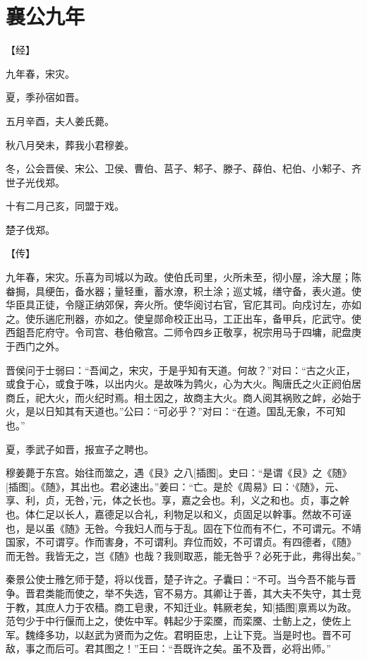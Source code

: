 \documentclass[a4paper,12pt,UTF8,twoside]{ctexbook}
\begin{document}
\chapter{襄公九年}


【经】

九年春，宋灾。

夏，季孙宿如晋。

五月辛酉，夫人姜氏薨。

秋八月癸未，葬我小君穆姜。

冬，公会晋侯、宋公、卫侯、曹伯、莒子、邾子、滕子、薛伯、杞伯、小邾子、齐世子光伐郑。

十有二月己亥，同盟于戏。

楚子伐郑。

【传】

九年春，宋灾。乐喜为司城以为政。使伯氏司里，火所未至，彻小屋，涂大屋；陈畚挶，具绠缶，备水器；量轻重，蓄水潦，积土涂；巡丈城，缮守备，表火道。使华臣具正徒，令隧正纳郊保，奔火所。使华阅讨右官，官庀其司。向戍讨左，亦如之。使乐遄庀刑器，亦如之。使皇郧命校正出马，工正出车，备甲兵，庀武守。使西鉏吾庀府守。令司宫、巷伯儆宫。二师令四乡正敬享，祝宗用马于四墉，祀盘庚于西门之外。

晋侯问于士弱曰：“吾闻之，宋灾，于是乎知有天道。何故？”对曰：“古之火正，或食于心，或食于咮，以出内火。是故咮为鹑火，心为大火。陶唐氏之火正阏伯居商丘，祀大火，而火纪时焉。相土因之，故商主大火。商人阅其祸败之衅，必始于火，是以日知其有天道也。”公曰：“可必乎？”对曰：“在道。国乱无象，不可知也。”

夏，季武子如晋，报宣子之聘也。

穆姜薨于东宫。始往而筮之，遇《艮》之八[插图]。史曰：“是谓《艮》之《随》[插图]。《随》，其出也。君必速出。”姜曰：“亡。是於《周易》曰：‘《随》，元、享、利，贞，无咎，’元，体之长也。享，嘉之会也。利，义之和也。贞，事之幹也。体仁足以长人，嘉德足以合礼，利物足以和义，贞固足以幹事。然故不可诬也，是以虽《随》无咎。今我妇人而与于乱。固在下位而有不仁，不可谓元。不靖国家，不可谓亨。作而害身，不可谓利。弃位而姣，不可谓贞。有四德者，《随》而无咎。我皆无之，岂《随》也哉？我则取恶，能无咎乎？必死于此，弗得出矣。”

秦景公使士雃乞师于楚，将以伐晋，楚子许之。子囊曰：“不可。当今吾不能与晋争。晋君类能而使之，举不失选，官不易方。其卿让于善，其大夫不失守，其士竞于教，其庶人力于农穑。商工皂隶，不知迁业。韩厥老矣，知[插图]禀焉以为政。范匄少于中行偃而上之，使佐中军。韩起少于栾黡，而栾黡、士鲂上之，使佐上军。魏绛多功，以赵武为贤而为之佐。君明臣忠，上让下竞。当是时也。晋不可敌，事之而后可。君其图之！”王曰：“吾既许之矣。虽不及晋，必将出师。”
\end{document}
